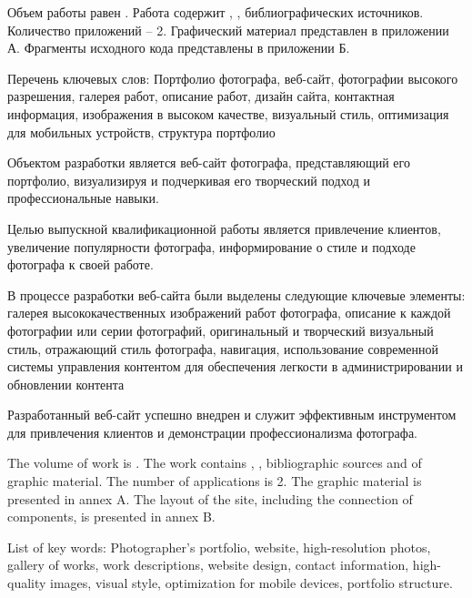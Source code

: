 
Объем работы равен . Работа содержит , ,  библиографических источников. Количество приложений – 2. Графический материал представлен в приложении А. Фрагменты исходного кода представлены в приложении Б.

Перечень ключевых слов: Портфолио фотографа, веб-сайт, фотографии высокого разрешения, галерея работ, описание работ, дизайн сайта, контактная информация, изображения в высоком качестве, визуальный стиль, оптимизация для мобильных устройств, структура портфолио

Объектом разработки является веб-сайт фотографа, представляющий его портфолио, визуализируя и подчеркивая его творческий подход и профессиональные навыки.

Целью выпускной квалификационной работы является привлечение клиентов, увеличение популярности фотографа, информирование о стиле и подходе фотографа к своей работе.

В процессе разработки веб-сайта были выделены следующие ключевые элементы: галерея высококачественных изображений работ фотографа, описание к каждой фотографии или серии фотографий, оригинальный и творческий визуальный стиль, отражающий стиль фотографа, навигация, использование современной системы управления контентом для обеспечения легкости в администрировании и обновлении контента

Разработанный веб-сайт успешно внедрен и служит эффективным инструментом для привлечения клиентов и демонстрации профессионализма фотографа.

  
The volume of work is . The work contains , ,  bibliographic sources and  of graphic material. The number of applications is 2. The graphic material is presented in annex A. The layout of the site, including the connection of components, is presented in annex B.

List of key words: Photographer's portfolio, website, high-resolution photos, gallery of works, work descriptions, website design, contact information, high-quality images, visual style, optimization for mobile devices, portfolio structure.


